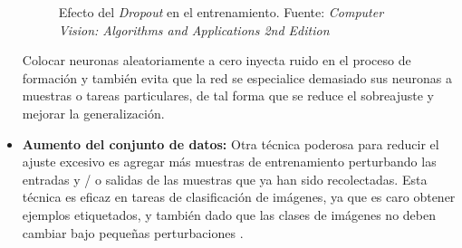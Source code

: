 \begin{itemize}
\begin{figure}[H]
        \caption[Efecto del \textit{Dropout} en el entrenamiento]{Efecto del \textit{Dropout} en el entrenamiento. {\footnotesize Fuente: \textit{Computer Vision:
Algorithms and Applications
2nd Edition}\cite[p~276]{Szeliski2022}}}
        \label{dropout}
    \end{figure}
    Colocar neuronas aleatoriamente a cero inyecta ruido en el proceso de formación y también evita que la red se especialice demasiado  sus neuronas a muestras o tareas particulares, de tal forma que se reduce el sobreajuste y mejorar la generalización.
    \item \textbf{Aumento del conjunto de datos:} Otra técnica poderosa para reducir el ajuste excesivo es agregar más muestras de entrenamiento perturbando las entradas y / o salidas de las muestras que ya han sido recolectadas. Esta técnica es eficaz en tareas de clasificación de imágenes, ya que es caro obtener ejemplos etiquetados, y también dado que las clases de imágenes no deben cambiar bajo pequeñas perturbaciones \cite[p~275]{Szeliski2022}.
\end{itemize}
